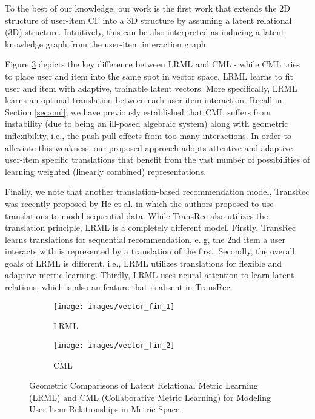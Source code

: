 \documentclass[sigconf]{acmart}
\begin{document}
To the best of our knowledge, our work is the first work that extends the 2D structure of user-item CF into a 3D structure by assuming a latent relational (3D) structure. Intuitively, this can be also interpreted as inducing a latent knowledge graph from the user-item interaction graph. 

Figure \ref{fig:vector} depicts the key difference between \textsc{LRML} and CML - while CML tries to place user and item into the same spot in vector space, \textsc{LRML} learns to fit user and item with adaptive, trainable latent vectors. 
 More specifically, \textsc{LRML} learns an optimal translation between each user-item interaction. Recall in Section \ref{sec:cml}, we have previously established that CML suffers from instability (due to being an ill-posed algebraic system) along with geometric inflexibility, i.e., the push-pull effects from too many interactions. In order to alleviate this weakness, our proposed approach adopts attentive and adaptive user-item specific translations that benefit from the vast number of possibilities of learning weighted (linearly combined) representations. 


 Finally, we note that another translation-based recommendation model, TransRec was recently proposed by He et al. \cite{He:2017:TR:3109859.3109882} in which the authors proposed to use translations to model sequential data. While TransRec also utilizes the translation principle, LRML is a completely different model. Firstly, TransRec learns translations for sequential recommendation, e..g, the 2nd item a user interacts with is represented by a translation of the first. Secondly, the overall goals of LRML is different, i.e., LRML utilizes translations for flexible and adaptive metric learning. Thirdly, LRML uses neural attention to learn latent relations, which is also an feature that is absent in TransRec.

 \begin{figure}[H]
\centering
\begin{subfigure}{0.25\textwidth}
  \centering
  \texttt{[image: images/vector\_fin\_1]}

  \caption{\textsc{LRML}}

  \label{fig:sub1}
\end{subfigure}\begin{subfigure}{0.25\textwidth}
  \centering
  \texttt{[image: images/vector\_fin\_2]}
    \caption{CML}
  \label{fig:sub2}
\end{subfigure}
\caption{Geometric Comparisons of Latent Relational Metric Learning (LRML) and CML (Collaborative Metric Learning) for Modeling User-Item Relationships in Metric Space. }
\label{fig:vector}
\end{figure}
\end{document}
